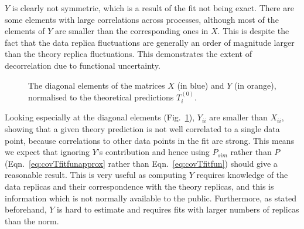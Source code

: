 $Y$ is clearly not symmetric, which is a result of the fit not being exact. There are some elements with large correlations across processes, although most of the elements of $Y$ are smaller than the corresponding ones in $X$. This is despite the fact that the data replica fluctuations are generally an order of magnitude larger than the theory replica fluctuations. This demonstrates the extent of decorrelation due to functional uncertainty.
\begin{figure}[h]
    \begin{center}
    \end{center}
  \vspace{-0.55cm}
  \caption{The diagonal elements of the matrices $X$ (in blue) and $Y$ (in orange), normalised to the theoretical predictions $T^{(0)}_i$.}
  \label{fig:XnYdiag}
\end{figure}
Looking especially at the diagonal elements (Fig.~\ref{fig:XnYdiag}), $Y_{ii}$ are smaller than $X_{ii}$, showing that a given theory prediction is not well correlated to a single data point, because correlations to other data points in the fit are strong. This means we expect that ignoring $Y$'s contribution and hence using $P_{sim}$ rather than $P$ (Eqn.~\ref{eq:covTfitfunapprox} rather than Eqn.~\ref{eq:covTfitfun}) should give a reasonable result. This is very useful as computing $Y$ requires knowledge of the data replicas and their correspondence with the theory replicas, and this is information which is not normally available to the public. Furthermore, as stated beforehand, $Y$ is hard to estimate and requires fits with larger numbers of replicas than the norm.

